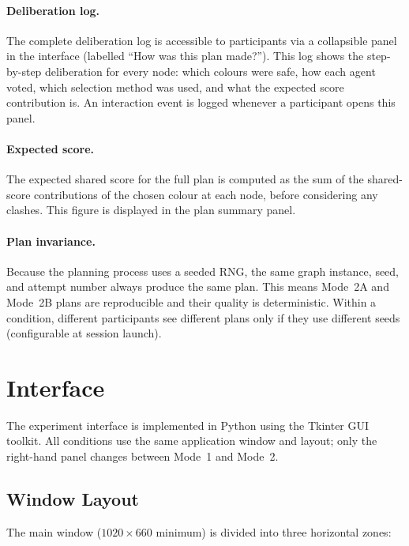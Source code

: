 \documentclass[11pt]{article}
\theoremstyle{definition}
\begin{document}
\paragraph{Deliberation log.}
The complete deliberation log is accessible to participants via a collapsible panel in
the interface (labelled ``How was this plan made?'').  This log shows the step-by-step
deliberation for every node: which colours were safe, how each agent voted, which
selection method was used, and what the expected score contribution is.  An interaction
event is logged whenever a participant opens this panel.

\paragraph{Expected score.}
The expected shared score for the full plan is computed as the sum of the shared-score
contributions of the chosen colour at each node, before considering any clashes.  This
figure is displayed in the plan summary panel.

\paragraph{Plan invariance.}
Because the planning process uses a seeded RNG, the same graph instance, seed, and
attempt number always produce the same plan.  This means Mode~2A and Mode~2B plans are
reproducible and their quality is deterministic.  Within a condition, different
participants see different plans only if they use different seeds (configurable at
session launch).

\section{Interface}
\label{sec:interface}

The experiment interface is implemented in Python using the Tkinter GUI toolkit.  All
conditions use the same application window and layout; only the right-hand panel changes
between Mode~1 and Mode~2.

\subsection{Window Layout}

The main window ($1020 \times 660$ minimum) is divided into three horizontal zones:
\end{document}
